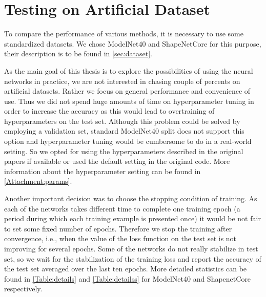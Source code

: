 \section{Testing on Artificial Dataset}
To compare the performance of various methods, it is necessary to use some standardized datasets. We chose ModelNet40 and ShapeNetCore for this purpose, their description is to be found in \autoref{sec:dataset}. \par
As the main goal of this thesis is to explore the possibilities of using the neural networks in practice, we are not interested in chasing couple of percents on artificial datasets. Rather we focus on general performance and convenience of use. Thus we did not spend huge amounts of time on hyperparameter tuning in order to increase the accuracy as this would lead to overtraining of hyperparameters on the test set. Although this problem could be solved by employing a validation set, standard ModelNet40 split does not support this option and hyperparameter tuning would be cumbersome to do in a real-world setting. So we opted for using the hyperparameters described in the original papers if available or used the default setting in the original code. More information about the hyperparameter setting can be found in \autoref{Attachment:params}. \par
Another important decision was to choose the stopping condition of training. As each of the networks takes different time to complete one training epoch (a period during which each training example is presented once) it would be not fair to set some fixed number of epochs. Therefore we stop the training after convergence, i.e., when the value of the loss function on the test set is not improving for several epochs. Some of the networks do not really stabilize in test set, so we wait for the stabilization of the training loss and report the accuracy of the test set averaged over the last ten epochs. More detailed statistics can be found in \autoref{Table:details} and \autoref{Table:detailss} for ModelNet40 and ShapenetCore respectively.


